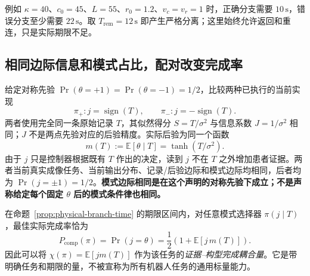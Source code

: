 \documentclass[UTF8,fontset=fandol,zihao=5,a4paper]{ctexart}
\theoremstyle{definition}
\theoremstyle{remark}\newtheorem{remark}[theorem]{说明}
\numberwithin{equation}{section}
\begin{document}
例如 \(\kappa=40\)、\(c_0=45\)、\(L=55\)、\(r_0=1.2\)、\(v_c=v_r=1\) 时，正确分支需要 \(10\,\mathrm{s}\)，错误分支至少需要 \(22\,\mathrm{s}\)。取 \(T_{\mathrm{rem}}=12\,\mathrm{s}\) 即产生严格分离；这里始终允许返回和重连，只是实际期限不足。

\subsection{相同边际信息和模式占比，配对改变完成率}

给定对称先验 \(\Pr(\theta=+1)=\Pr(\theta=-1)=1/2\)，比较两种已执行的当前实现
\begin{equation}
\pi_+:j=\operatorname{sign}(T),\qquad
\pi_-:j=-\operatorname{sign}(T).
\label{eq:physical-pairing}
\end{equation}
两者使用完全同一条原始记录 \(T\)，其似然得分 \(S=T/\sigma^2\) 与信息系数 \(J=1/\sigma^2\) 相同；\(J\) 不是两点先验对应的后验精度。实际后验为同一个函数
\begin{equation}
m(T):=\mathbb E[\theta\mid T]=\tanh(T/\sigma^2).
\label{eq:binary-posterior}
\end{equation}
由于 \(j\) 只是控制器根据既有 \(T\) 作出的决定，读到 \(j\) 不在 \(T\) 之外增加患者证据。两者当前真实成像任务、当前输出分布、记录/后验边际和模式边际均相同，后者均为 \(\Pr(j=\pm1)=1/2\)。\textbf{模式边际相同是在这个声明的对称先验下成立；不是声称给定每个固定 \(\theta\) 后的模式条件律也相同。}

在命题~\ref{prop:physical-branch-time} 的期限区间内，对任意模式选择器 \(\pi(j\mid T)\)，最佳实际完成率恰为
\begin{equation}
P_{\mathrm{comp}}(\pi)
=\Pr(j=\theta)
=\frac12\left(1+\mathbb E[j\,m(T)]\right).
\label{eq:physical-coupling-value}
\end{equation}
因此可以将 \(\chi(\pi)=\mathbb E[jm(T)]\) 作为该任务的\emph{证据--构型完成耦合量}。它是带明确任务和期限的量，不被宣称为所有机器人任务的通用标量能力。
\end{document}
